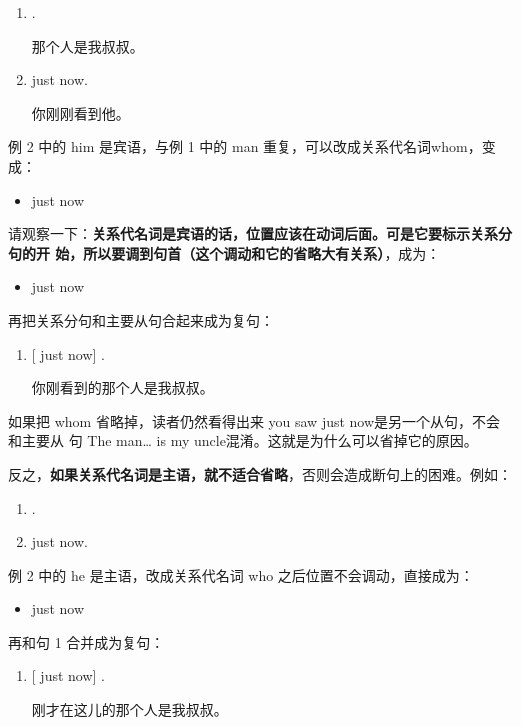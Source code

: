 \begin{enumerate}
\item {}  .

  那个人是我叔叔。
\item {}   just now.

  你刚刚看到他。
\end{enumerate}

例 2 中的 him 是宾语，与例 1 中的 man 重复，可以改成关系代名词whom，变成：
\begin{itemize}
\item {}   just now
\end{itemize}

请观察一下：\textbf{关系代名词是宾语的话，位置应该在动词后面。可是它要标示关系分句的开
  始，所以要调到句首（这个调动和它的省略大有关系）}，成为：
\begin{itemize}
\item {}   just now
\end{itemize}

再把关系分句和主要从句合起来成为复句：
\begin{enumerate}[resume]
\item {} [   just now]  .

  你刚看到的那个人是我叔叔。
\end{enumerate}

如果把 whom 省略掉，读者仍然看得出来 you saw just now是另一个从句，不会和主要从
句 The man\ldots{} is my uncle混淆。这就是为什么可以省掉它的原因。

反之，\textbf{如果关系代名词是主语，就不适合省略}，否则会造成断句上的困难。例如：

\begin{enumerate}
\item {}  .
\item {}   just now.
\end{enumerate}

例 2 中的 he 是主语，改成关系代名词 who 之后位置不会调动，直接成为：
\begin{itemize}
\item {}   just now
\end{itemize}

再和句 1 合并成为复句：
\begin{enumerate}[resume]
\item {} [   just
  now]  .

  刚才在这儿的那个人是我叔叔。
\end{enumerate}

